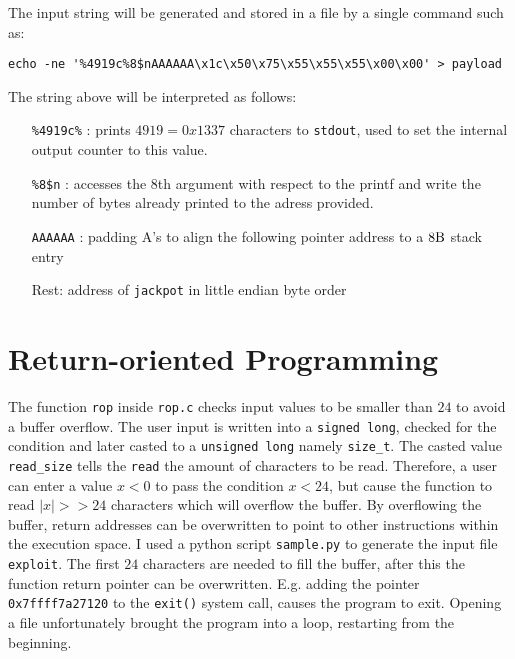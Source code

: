 \documentclass[12pt]{article}
\begin{document}
The input string will be generated and stored in a file by a single command such as:
\begin{lstlisting}
echo -ne '%4919c%8$nAAAAAA\x1c\x50\x75\x55\x55\x55\x00\x00' > payload
\end{lstlisting}
The string above will be interpreted as follows:
\begin{itemize}
	\item[\texttt{\%4919c\%} :] prints $4919 = 0x1337$ characters to \texttt{stdout}, used to set the internal output counter to this value.
	\item[\texttt{\%8\$n} :] accesses the 8th argument with respect to the printf and write the number of bytes already printed to the adress provided.
	\item[\texttt{AAAAAA} :] padding A's to align the following pointer address to a $8\si{\byte}$ stack entry
	\item[Rest:] address of \texttt{jackpot} in little endian byte order
\end{itemize}





\newpage
\section{Return-oriented Programming}
The function \texttt{rop} inside \texttt{rop.c} checks input values to be smaller than $24$ to avoid a buffer overflow. The user input is written into a \texttt{signed long}, checked for the condition and later casted to a \texttt{unsigned long} namely \texttt{size\_t}. The casted value \texttt{read\_size} tells the \texttt{read} the amount of characters to be read. Therefore, a user can enter a value $x<0$ to pass the condition $x<24$, but cause the function to read $|x|>>24$ characters which will overflow the  buffer.
By overflowing the buffer, return addresses can be overwritten to point to other instructions within the execution space.
I used a python script \texttt{sample.py} to generate the input file \texttt{exploit}.
The first $24$ characters are needed to fill the buffer, after this the function return pointer can be overwritten.
E.g. adding the pointer \texttt{0x7ffff7a27120} to the \texttt{exit()} system call, causes the program to exit.
Opening a file unfortunately brought the program into a loop, restarting from the beginning. 
\end{document}
